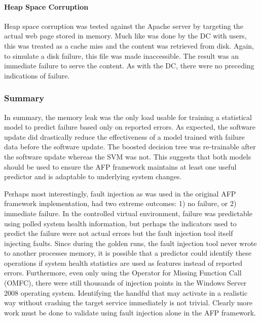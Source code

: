 \paragraph{Heap Space Corruption}
Heap space corruption was tested against the Apache server by targeting the
actual web page stored in memory.  Much like was done by the \ac{DC} with
users, this was treated as a cache miss and the content was retrieved from
disk.  Again, to simulate a disk failure, this file was made inaccessible.  The
result was an immediate failure to serve the content.  As with the \ac{DC},
there were no preceding indications of failure.

\subsubsection{Summary}
In summary, the memory leak was the only load usable for training a statistical
model to predict failure based only on reported errors.  As expected, the
software update did drastically reduce the effectiveness of a model trained
with failure data before the software update.  The boosted decision tree was
re-trainable after the software update whereas the \ac{SVM} was not.  This
suggests that both models should be used to ensure the \ac{AFP} framework
maintains at least one useful predictor and is adaptable to underlying system
changes.

Perhaps most interestingly, fault injection as was used in the original
\ac{AFP} framework implementation, had two extreme outcomes: 1) no failure, or
2) immediate failure.  In the controlled virtual environment, failure was
predictable using polled system health information, but perhaps the indicators
used to predict the failure were not actual errors but the fault injection tool
itself injecting faults.  Since during the golden runs, the fault injection
tool never wrote to another processes memory, it is possible that a predictor
could identify these operations if system health statistics are used as
features instead of reported errors.  Furthermore, even only using the Operator
for Missing Function Call (OMFC), there were still thousands of injection
points in the Windows Server 2008 operating system.  Identifying the handful
that may activate in a realistic way without crashing the target service
immediately is not trivial.  Clearly more work must be done to validate using
fault injection alone in the \ac{AFP} framework.

